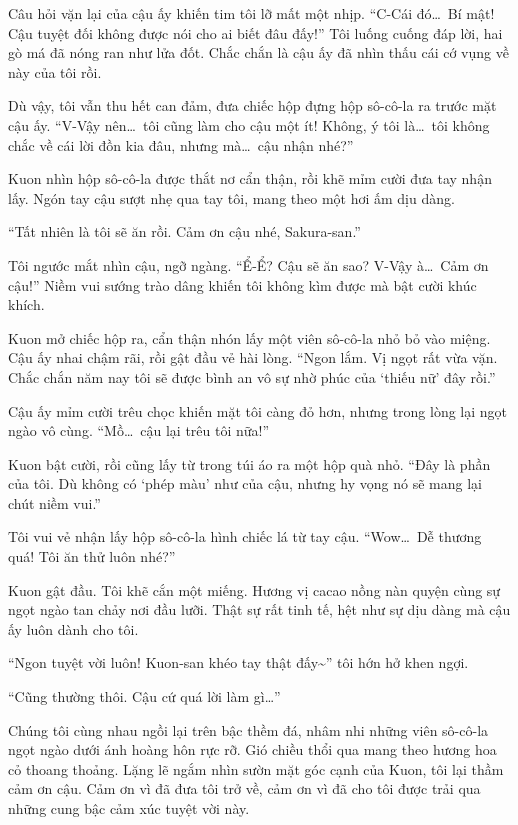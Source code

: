 \documentclass[../main.tex]{subfiles}
\begin{document}
Câu hỏi vặn lại của cậu ấy khiến tim tôi lỡ mất một nhịp. ``C-Cái đó\dots\ Bí mật! Cậu tuyệt đối không được nói cho ai biết đâu đấy!'' Tôi luống cuống đáp lời, hai gò má đã nóng ran như lửa đốt. Chắc chắn là cậu ấy đã nhìn thấu cái cớ vụng về này của tôi rồi.

Dù vậy, tôi vẫn thu hết can đảm, đưa chiếc hộp đựng hộp sô-cô-la ra trước mặt cậu ấy. ``V-Vậy nên\dots\ tôi cũng làm cho cậu một ít! Không, ý tôi là\dots\ tôi không chắc về cái lời đồn kia đâu, nhưng mà\dots\ cậu nhận nhé?''

Kuon nhìn hộp sô-cô-la được thắt nơ cẩn thận, rồi khẽ mỉm cười đưa tay nhận lấy. Ngón tay cậu sượt nhẹ qua tay tôi, mang theo một hơi ấm dịu dàng.

``Tất nhiên là tôi sẽ ăn rồi. Cảm ơn cậu nhé, Sakura-san.''

Tôi ngước mắt nhìn cậu, ngỡ ngàng. ``Ể-Ể? Cậu sẽ ăn sao? V-Vậy à\dots\ Cảm ơn cậu!'' Niềm vui sướng trào dâng khiến tôi không kìm được mà bật cười khúc khích.

Kuon mở chiếc hộp ra, cẩn thận nhón lấy một viên sô-cô-la nhỏ bỏ vào miệng. Cậu ấy nhai chậm rãi, rồi gật đầu vẻ hài lòng. ``Ngon lắm. Vị ngọt rất vừa vặn. Chắc chắn năm nay tôi sẽ được bình an vô sự nhờ phúc của `thiếu nữ' đây rồi.''

Cậu ấy mỉm cười trêu chọc khiến mặt tôi càng đỏ hơn, nhưng trong lòng lại ngọt ngào vô cùng. ``Mồ\dots\ cậu lại trêu tôi nữa!''

Kuon bật cười, rồi cũng lấy từ trong túi áo ra một hộp quà nhỏ. ``Đây là phần của tôi. Dù không có `phép màu' như của cậu, nhưng hy vọng nó sẽ mang lại chút niềm vui.''

Tôi vui vẻ nhận lấy hộp sô-cô-la hình chiếc lá từ tay cậu. ``Wow\dots\ Dễ thương quá! Tôi ăn thử luôn nhé?''

Kuon gật đầu. Tôi khẽ cắn một miếng. Hương vị cacao nồng nàn quyện cùng sự ngọt ngào tan chảy nơi đầu lưỡi. Thật sự rất tinh tế, hệt như sự dịu dàng mà cậu ấy luôn dành cho tôi.

``Ngon tuyệt vời luôn! Kuon-san khéo tay thật đấy\~{}'' tôi hớn hở khen ngợi.

``Cũng thường thôi. Cậu cứ quá lời làm gì\dots''

Chúng tôi cùng nhau ngồi lại trên bậc thềm đá, nhâm nhi những viên sô-cô-la ngọt ngào dưới ánh hoàng hôn rực rỡ. Gió chiều thổi qua mang theo hương hoa cỏ thoang thoảng. Lặng lẽ ngắm nhìn sườn mặt góc cạnh của Kuon, tôi lại thầm cảm ơn cậu. Cảm ơn vì đã đưa tôi trở về, cảm ơn vì đã cho tôi được trải qua những cung bậc cảm xúc tuyệt vời này.
\end{document}
